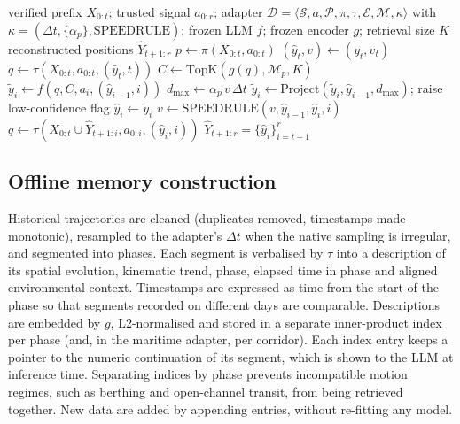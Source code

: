 \begin{algorithm}[t]
\caption{Online reconstruction with the shared engine and a domain adapter $\mathcal{D}$}
\label{alg:reconstruction}
\begin{algorithmic}[1]
\Require verified prefix $X_{0:t}$; trusted signal $a_{0:r}$; adapter
$\mathcal{D} = \langle \mathcal{S}, a, \mathcal{P}, \pi, \tau, \mathcal{E}, \mathcal{M}, \kappa \rangle$
with $\kappa = (\Delta t, \{\alpha_p\}, \mathrm{SPEEDRULE})$; frozen LLM $f$;
frozen encoder $g$; retrieval size $K$
\Ensure reconstructed positions $\hat{Y}_{t+1:r}$
\State $p \gets \pi(X_{0:t}, a_{0:t})$ 
\State $(\hat{y}_t, v) \gets (y_t, v_t)$ 
\State $q \gets \tau(X_{0:t}, a_{0:t}, (\hat{y}_t, t))$ 
  \State $C \gets \mathrm{TopK}(g(q), \mathcal{M}_p, K)$ 
  \State $\tilde{y}_i \gets f(q, C, a_i, (\hat{y}_{i-1}, i))$ 
  \State $d_{\max} \gets \alpha_p \, v \, \Delta t$
    \State $\tilde{y}_i \gets \mathrm{Project}(\tilde{y}_i, \hat{y}_{i-1}, d_{\max})$; raise low-confidence flag
  \EndIf
  \State $\hat{y}_i \gets \tilde{y}_i$
  \State $v \gets \mathrm{SPEEDRULE}(v, \hat{y}_{i-1}, \hat{y}_i, i)$ 
  \State $q \gets \tau(X_{0:t} \cup \hat{Y}_{t+1:i}, a_{0:i}, (\hat{y}_i, i))$ 
\EndFor
\State \Return $\hat{Y}_{t+1:r} = \{\hat{y}_i\}_{i=t+1}^{r}$
\end{algorithmic}
\end{algorithm}

\subsection{Offline memory construction}
\label{sec:offline-memory}

Historical trajectories are cleaned (duplicates removed, timestamps made
monotonic), resampled to the adapter's $\Delta t$ when the native sampling
is irregular, and segmented into phases. Each segment is verbalised by
$\tau$ into a description of its spatial evolution, kinematic trend, phase,
elapsed time in phase and aligned environmental context. Timestamps are
expressed as time from the start of the phase so that segments recorded on
different days are comparable. Descriptions are embedded by $g$,
L2-normalised and stored in a separate inner-product index per phase (and,
in the maritime adapter, per corridor). Each index entry keeps a pointer to
the numeric continuation of its segment, which is shown to the LLM at
inference time. Separating indices by phase prevents incompatible motion
regimes, such as berthing and open-channel transit, from being retrieved
together. New data are added by appending entries, without re-fitting any
model.

